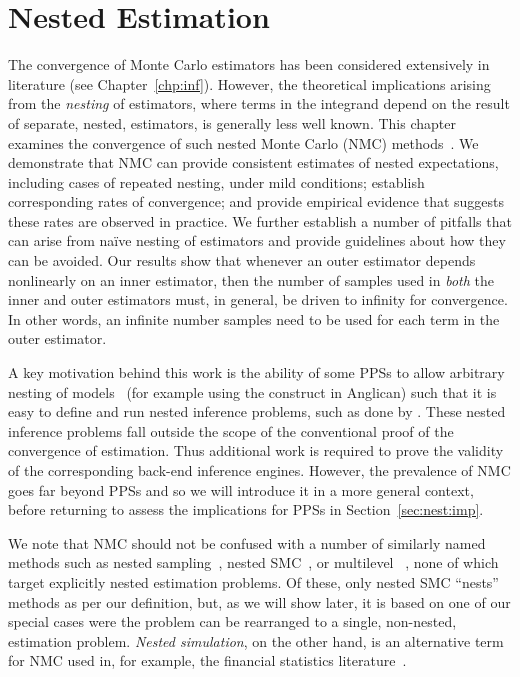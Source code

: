 
\chapter{Nested Estimation}
\label{chp:nest}

The convergence of Monte Carlo estimators has been considered extensively in 
literature (see Chapter~\ref{chp:inf}).  However, the theoretical implications
arising from the \emph{nesting} of \mc estimators, where terms in the integrand depend on the
result of separate, nested, \mc estimators, is generally less well known.
This chapter examines the convergence of such nested Monte Carlo (NMC) 
methods~\citep{rainforth2016pitfalls,rainforth2017pitfalls}.
We demonstrate that NMC can provide consistent estimates of 
nested expectations, including cases of repeated nesting, under mild conditions;
establish corresponding rates of convergence;
and provide empirical evidence that suggests these rates are observed in practice.
We further establish a number of pitfalls that can arise from na\"{i}ve nesting of \mc estimators
and provide guidelines about how they can be avoided.
Our results show that whenever an outer estimator depends nonlinearly on an inner
estimator, then the number of samples used in \emph{both} the inner and outer estimators
must, in general, be driven to infinity for convergence.  In other words, an infinite number samples
need to be used for each term in the outer estimator.

A key motivation behind this work is the ability of some PPSs to allow
arbitrary nesting of models~\citep{mantadelis2011nesting,stuhlmuller2014reasoning} (for example using
 the \conditional construct in Anglican)
such that it is easy to define and run nested inference problems, such as done
by \citep{ouyang2016practical,le2016nested}. These nested inference problems fall outside the
scope of the conventional proof of the convergence of \mc estimation. Thus additional
work is required to prove the validity of the corresponding back-end inference engines.
However, the prevalence of NMC goes far beyond PPSs and so we will introduce it in
a more general context, before returning to assess the implications for PPSs in Section~\ref{sec:nest:imp}.

We note that NMC should not be confused with a number of similarly named methods such
as nested sampling~\citep{skilling2004nested}, nested SMC~\citep{naessethLS2015nested}, or multilevel 
\mc~\citep{heinrich2001multilevel}, none of
which target explicitly nested estimation problems.  Of these, only nested SMC ``nests'' \mc
methods as per our definition, but, as we will show later, it is based on one of our special cases
were the problem can be rearranged to a single, non-nested, estimation problem.  
\emph{Nested simulation}, on the other hand, is an alternative term for NMC
used in, for example, the financial statistics literature~\citep{gordy2010nested}.









%
%

%
